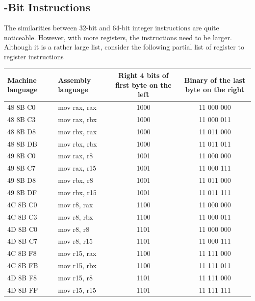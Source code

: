 \documentclass[10pt]{book}
\begin{document}
\subsection{-Bit Instructions}
The similarities between 32-bit and 64-bit integer instructions are quite noticeable. However, with more registers, the instructions need to be larger. Although it is a rather large list, consider the following partial list of register to register instructions
\begin{center}
\begin{tabular}{|l|l|c|c|}
\hline
Machine language & Assembly language & Right 4 bits of first byte on the left & Binary of the last byte on the right \\
\hline
48 8B C0 & mov rax, rax & 1000 & 11 000 000 \\
\hline
48 8B C3 & mov rax, rbx & 1000 & 11 000 011 \\
\hline
48 8B D8 & mov rbx, rax & 1000 & 11 011 000 \\
\hline
48 8B DB & mov rbx, rbx & 1000 & 11 011 011 \\
\hline
49 8B C0 & mov rax, r8 & 1001 & 11 000 000 \\
\hline
49 8B C7 & mov rax, r15 & 1001 & 11 000 111 \\
\hline
49 8B D8 & mov rbx, r8 & 1001 & 11 011 000 \\
\hline
49 8B DF & mov rbx, r15 & 1001 & 11 011 111 \\
\hline
4C 8B C0 & mov r8, rax & 1100 & 11 000 000 \\
\hline
4C 8B C3 & mov r8, rbx & 1100 & 11 000 011 \\
\hline
4D 8B C0 & mov r8, r8 & 1101 & 11 000 000 \\
\hline
4D 8B C7 & mov r8, r15 & 1101 & 11 000 111 \\
\hline
4C 8B F8 & mov r15, rax & 1100 & 11 111 000 \\
\hline
4C 8B FB & mov r15, rbx & 1100 & 11 111 011 \\
\hline
4D 8B F8 & mov r15, r8 & 1101 & 11 111 000 \\
\hline
4D 8B FF & mov r15, r15 & 1101 & 11 111 111 \\
\hline
\end{tabular}
\end{center}
\end{document}
